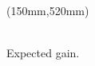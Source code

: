 \documentclass[a0, portrait]{a0poster}
\begin{document}
\begin{textblock*}{110mm}(150mm,520mm)
\begin{center}
 \\
\small Expected gain.
\end{center}
\end{textblock*}
\end{document}
